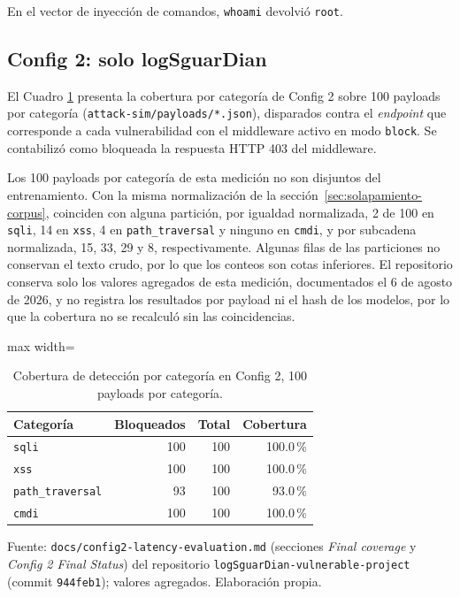En el vector de inyección de comandos, \texttt{whoami} devolvió \texttt{root}.

\subsection{Config 2: solo logSguarDian}\label{sec:config2}

El Cuadro \ref{tabla:res-config2-cobertura} presenta la cobertura por categoría de Config 2 sobre 100 payloads por categoría (\texttt{attack-sim/payloads/*.json}), disparados contra el \textit{endpoint} que corresponde a cada vulnerabilidad con el middleware activo en modo \texttt{block}. Se contabilizó como bloqueada la respuesta HTTP 403 del middleware.

Los 100 payloads por categoría de esta medición no son disjuntos del entrenamiento. Con la misma normalización de la sección~\ref{sec:solapamiento-corpus}, coinciden con alguna partición, por igualdad normalizada, 2 de 100 en \texttt{sqli}, 14 en \texttt{xss}, 4 en \texttt{path\_traversal} y ninguno en \texttt{cmdi}, y por subcadena normalizada, 15, 33, 29 y 8, respectivamente. Algunas filas de las particiones no conservan el texto crudo, por lo que los conteos son cotas inferiores. El repositorio conserva solo los valores agregados de esta medición, documentados el 6 de agosto de 2026, y no registra los resultados por payload ni el hash de los modelos, por lo que la cobertura no se recalculó sin las coincidencias.

\begin{table}[htbp]
\centering
\footnotesize
\setlength{\tabcolsep}{3pt}
\begin{adjustbox}{max width=\linewidth}
\begin{tabular}{|l|r|r|r|}
\hline
\textbf{Categoría} & \textbf{Bloqueados} & \textbf{Total} & \textbf{Cobertura} \\ \hline
\texttt{sqli} & 100 & 100 & 100.0\,\% \\ \hline
\texttt{xss} & 100 & 100 & 100.0\,\% \\ \hline
\texttt{path\_traversal} & 93 & 100 & 93.0\,\% \\ \hline
\texttt{cmdi} & 100 & 100 & 100.0\,\% \\ \hline
\end{tabular}
\end{adjustbox}
\caption{Cobertura de detección por categoría en Config 2, 100 payloads por categoría.}
\label{tabla:res-config2-cobertura}
\par\smallskip\footnotesize Fuente: \texttt{docs/config2-latency-evaluation.md} (secciones \textit{Final coverage} y \textit{Config 2 Final Status}) del repositorio \texttt{logSguarDian-vulnerable-project} (commit \texttt{944feb1}); valores agregados. Elaboración propia.
\end{table}

